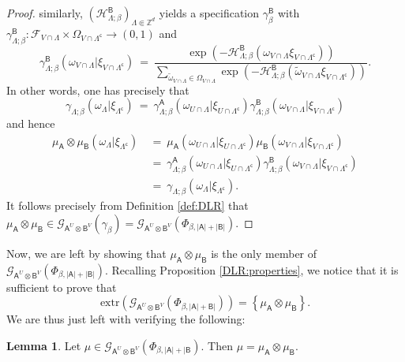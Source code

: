 \documentclass[12pt]{article}
\renewcommand{\AA}{\mathsf{A}}
\newcommand{\AB}{\mathsf{B}}
\newcommand{\F}{\mathcal{F}}
\newcommand{\G}{\mathcal{G}}
\renewcommand{\H}{\mathcal{H}}
\newcommand{\Z}{\mathbb{Z}}
\newcommand{\extr}{\mathrm{extr}}
\newcommand{\set}[1]{\left\{#1\right\}}
\newcommand{\ra}{\rightarrow}
\newcommand{\1}{\mathbbm{1}}
\renewcommand{\c}{\mathsf{c}}
\newcommand{\5}{\vspace{0.5cm}}
\renewcommand{\tilde}{\widetilde}
\theoremstyle{definition}
\newtheorem{lem}[thm]{Lemma}
\begin{document}
\begin{proof}
similarly, $(\H_{\Lambda;\beta}^\AB)_{\Lambda\Subset\Z^d}$ yields a specification $\gamma_\beta^\AB$ with $\gamma_{\Lambda;\beta}^\AB:\F_{V\cap\Lambda}\times\Omega_{V\cap\Lambda^\c}\ra(0,1)$ and
$$\gamma_{\Lambda;\beta}^\AB(\omega_{V\cap\Lambda}|\xi_{V\cap\Lambda^\c}) ~=~ \frac{\exp(-\H_{\Lambda;\beta}^{\AB}(\omega_{V\cap\Lambda}\xi_{V\cap\Lambda^\c}))}{\sum_{\tilde{\omega}_{V\cap\Lambda}\in\Omega_{V\cap\Lambda}}\exp(-\H_{\Lambda;\beta}^{\AB}(\tilde{\omega}_{V\cap\Lambda}\xi_{V\cap\Lambda^\c}))}.$$
In other words, one has precisely that
$$\gamma_{\Lambda;\beta}(\omega_\Lambda|\xi_{\Lambda^\c}) ~=~ \gamma_{\Lambda;\beta}^\AA(\omega_{U\cap\Lambda}|\xi_{U\cap\Lambda^\c})\gamma_{\Lambda;\beta}^\AB(\omega_{V\cap\Lambda}|\xi_{V\cap\Lambda^\c})$$
and hence
\begin{align*}
\mu_\AA\otimes\mu_\AB(\omega_\Lambda|\xi_{\Lambda^\c}) ~&=~ \mu_\AA(\omega_{U\cap\Lambda}|\xi_{U\cap\Lambda^\c})\mu_\AB(\omega_{V\cap\Lambda}|\xi_{V\cap\Lambda^\c}) \\
&=~ \gamma_{\Lambda;\beta}^\AA(\omega_{U\cap\Lambda}|\xi_{U\cap\Lambda^\c})\gamma_{\Lambda;\beta}^\AB(\omega_{V\cap\Lambda}|\xi_{V\cap\Lambda^\c}) \\
&=~ \gamma_{\Lambda;\beta}(\omega_\Lambda|\xi_{\Lambda^\c}).
\end{align*}
It follows precisely from Definition \ref{def:DLR} that $\mu_\AA\otimes\mu_\AB\in\G_{\AA^U\otimes\AB^V}(\gamma_\beta)=\G_{\AA^U\otimes\AB^V}(\Phi_{\beta,|\AA|+|\AB|})$.
\end{proof}

Now, we are left by showing that $\mu_\AA\otimes\mu_\AB$ is the only member of $\G_{\AA^U\otimes\AB^V}(\Phi_{\beta,|\AA|+|\AB|})$. Recalling Proposition \ref{DLR:properties}, we notice that it is sufficient to prove that 
$$\extr(\G_{\AA^U\otimes\AB^V}(\Phi_{\beta,|\AA|+\AB|}))=\set{\mu_\AA\otimes\mu_\AB}.$$
We are thus just left with verifying the following:
\begin{lem}
Let $\mu\in\G_{\AA^U\otimes\AB^V}(\Phi_{\beta,|\AA|+|\AB})$. Then $\mu=\mu_\AA\otimes\mu_\AB$.
\end{lem}


\pagebreak

\end{document}

